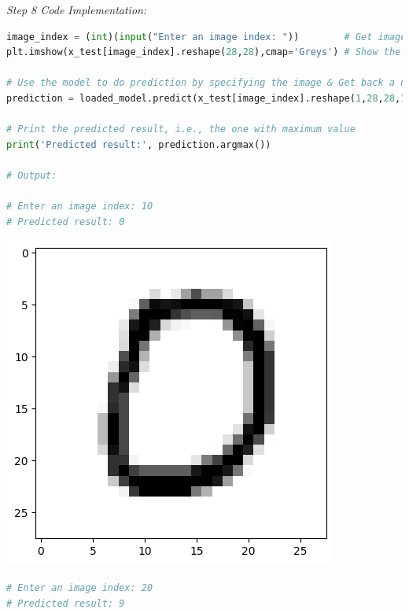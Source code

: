 \documentclass{book}
\begin{document}
\vspace{3mm}
\textit{\large{Step 8 Code Implementation:}}
\begin{lstlisting}[language=Python, basicstyle=\ttfamily\small, keywordstyle=\color{blue}, commentstyle=\color{forestgreen}, stringstyle=\color{red}, showstringspaces=false]
image_index = (int)(input("Enter an image index: "))        # Get image index from user
plt.imshow(x_test[image_index].reshape(28,28),cmap='Greys') # Show the image in greyscale

# Use the model to do prediction by specifying the image & Get back a numpy array of prediction
prediction = loaded_model.predict(x_test[image_index].reshape(1,28,28,1))

# Print the predicted result, i.e., the one with maximum value
print('Predicted result:', prediction.argmax())

# Output:

# Enter an image index: 10
# Predicted result: 0
\end{lstlisting}
\begin{center}
    \includegraphics[scale=0.4]{chapter 9/ch9_figure11.png}
\end{center}
\begin{lstlisting}[language=Python, basicstyle=\ttfamily\small, keywordstyle=\color{blue}, commentstyle=\color{forestgreen}, stringstyle=\color{red}, showstringspaces=false]
# Enter an image index: 20
# Predicted result: 9   
\end{lstlisting}
\end{document}
